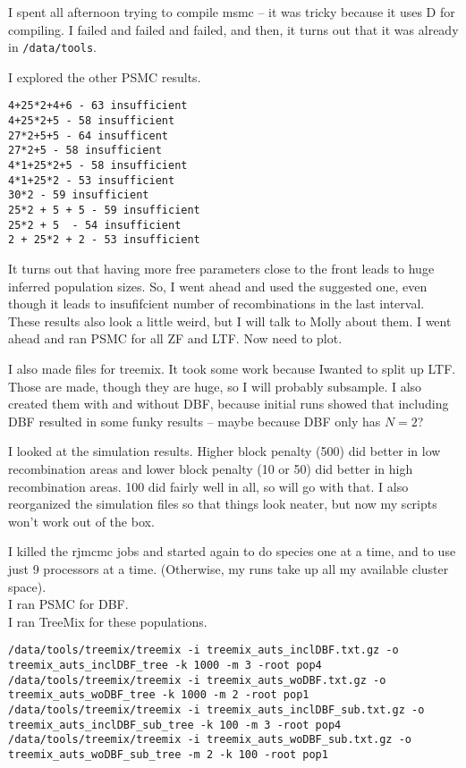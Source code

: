 \documentclass[idxtotoc,hyperref,openany,oneside]{labbook} %
\begin{document}
I spent all afternoon trying to compile msmc -- it was tricky because it uses D for compiling. I failed and failed and failed, and then,  it turns out that it was already in \verb+/data/tools+.

I explored the other PSMC results. \\
\begin{verbatim}
4+25*2+4+6 - 63 insufficient 
4+25*2+5 - 58 insufficient 
27*2+5+5 - 64 insufficent 
27*2+5 - 58 insufficient 
4*1+25*2+5 - 58 insufficient 
4*1+25*2 - 53 insufficient 
30*2 - 59 insufficient 
25*2 + 5 + 5 - 59 insufficient 
25*2 + 5  - 54 insufficient 
2 + 25*2 + 2 - 53 insufficient 
\end{verbatim}
It turns out that having more free parameters close to the front leads to huge inferred population sizes. So, I went ahead and used the suggested one, even though it leads to insufifcient number of recombinations in the last interval. These results also look a little weird, but I will talk to Molly about them. I went ahead and ran PSMC for all ZF and LTF. Now need to plot.

I also made files for treemix. It took some work because Iwanted to split up LTF. Those are made, though they are huge, so I will probably subsample. I also created them with and without DBF, because initial runs showed that including DBF resulted in some funky results -- maybe because DBF only has $N=2$?

I looked at the simulation results. Higher block penalty (500) did better in low recombination areas and lower block penalty (10 or 50) did better in high recombination areas. 100 did fairly well in all, so will go with that. I also reorganized the simulation files so that things look neater, but now my scripts won't work out of the box.

I killed the rjmcmc jobs and started again to do species one at a time, and to use just 9 processors at a time. (Otherwise, my runs take up all my available cluster space). \\

I ran PSMC for DBF. \\

I ran TreeMix for these populations.
\begin{verbatim}
/data/tools/treemix/treemix -i treemix_auts_inclDBF.txt.gz -o treemix_auts_inclDBF_tree -k 1000 -m 3 -root pop4
/data/tools/treemix/treemix -i treemix_auts_woDBF.txt.gz -o treemix_auts_woDBF_tree -k 1000 -m 2 -root pop1
/data/tools/treemix/treemix -i treemix_auts_inclDBF_sub.txt.gz -o treemix_auts_inclDBF_sub_tree -k 100 -m 3 -root pop4
/data/tools/treemix/treemix -i treemix_auts_woDBF_sub.txt.gz -o treemix_auts_woDBF_sub_tree -m 2 -k 100 -root pop1
\end{verbatim}
\end{document}
